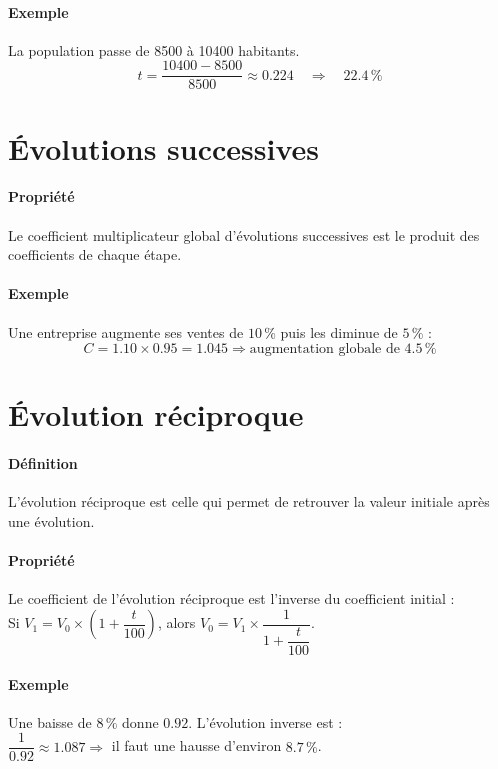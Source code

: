 \documentclass[answers]{exam}
\begin{document}
\paragraph{Exemple}
La population passe de 8500 à 10400 habitants. \\
\[
t = \dfrac{10400 - 8500}{8500} \approx \boxed{0.224} \quad \Rightarrow \quad \boxed{22.4\,\%}
\]

\section*{Évolutions successives}

\paragraph{Propriété}
Le coefficient multiplicateur global d’évolutions successives est le produit des coefficients de chaque étape.

\paragraph{Exemple}
Une entreprise augmente ses ventes de $10\,\%$ puis les diminue de $5\,\%$ : \\
\[
C = 1.10 \times 0.95 = 1.045 \Rightarrow \text{augmentation globale de } \boxed{4.5\,\%}
\]

\section*{Évolution réciproque}

\paragraph{Définition}
L'évolution réciproque est celle qui permet de retrouver la valeur initiale après une évolution.

\paragraph{Propriété}
Le coefficient de l’évolution réciproque est l’inverse du coefficient initial :\\
Si $V_1 = V_0 \times (1 + \dfrac{t}{100})$, alors $V_0 = V_1 \times \dfrac{1}{1 + \dfrac{t}{100}}$.

\paragraph{Exemple}
Une baisse de $8\,\%$ donne $0.92$. L’évolution inverse est : \\
$\dfrac{1}{0.92} \approx 1.087 \Rightarrow$ il faut une hausse d’environ $\boxed{8.7\,\%}$.
\end{document}
